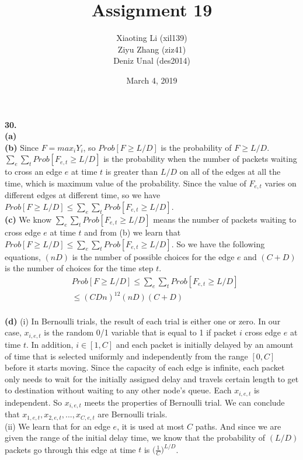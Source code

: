 \documentclass{article}
\title{Assignment 19}
\author{Xiaoting Li (xil139) \\
Ziyu Zhang (ziz41) \\
Deniz Unal (des2014)}
\date{March 4, 2019}
\begin{document}
\maketitle

\noindent
\textbf{30.} \\ \newline
\textbf{(a)} \\ \newline
\textbf{(b)} Since $F = max_iY_i$, so $Prob[F \geq L/D]$ is the probability of $F \geq L/D$. $\sum_e\sum_tProb[F_{e,t} \geq L/D]$ is the probability when the number of packets waiting to cross an edge $e$ at time $t$ is greater than $L/D$ on all of the edges at all the time, which is maximum value of the probability. Since the value of $F_{e,t}$ varies on different edges at different time, so we have $Prob[F \geq L/D] \leq \sum_e\sum_tProb[F_{e,t} \geq L/D]$.\\ \newline
\textbf{(c)} We know $\sum_e\sum_tProb[F_{e,t} \geq L/D]$ means the number of packets waiting to cross edge $e$ at time $t$ and from (b) we learn that $Prob[F \geq L/D] \leq \sum_e\sum_tProb[F_{e,t} \geq L/D]$. So we have the following equations, $(nD)$ is the number of possible choices for the edge $e$ and $(C + D)$ is the number of choices for the time step $t$.
\begin{align*}
&Prob[F\geq L/D] \leq \sum_e\sum_tProb[F_{e,t} \geq L/D] \\
&\leq(CDn)^{12}(nD)(C + D)
\end{align*}\\ \newline
\textbf{(d)} (i) In Bernoulli trials, the result of each trial is either one or zero. In our case, $x_{i,e,t}$ is the random 0/1 variable that is equal to 1 if packet $i$ cross edge $e
$ at time $t$. In addition, $i\in [1, C]$ and each packet is initially delayed by an amount of time that is selected uniformly and independently from the range $[0,C]$ before it starts moving. Since the capacity of each edge is infinite, each packet only needs to wait for the initially assigned delay and travels certain length to get to destination without waiting to any other node's queue. Each $x_{i,e,t}$ is independent. So $x_{i,e,t}$ meets the properties of Bernoulli trial. We can conclude that $x_{1,e,t}, x_{2,e,t}, ... , x_{C,e,t}$ are Bernoulli trials.\\ \newline 
(ii) We learn that for an edge $e$, it is used at most $C$ paths. And since we are given the range of the initial delay time, we know that the probability of $(L/D)$ packets go through this edge at time $t$ is $\big(\frac{1}{C})^{L/D}$.
\end{document}

